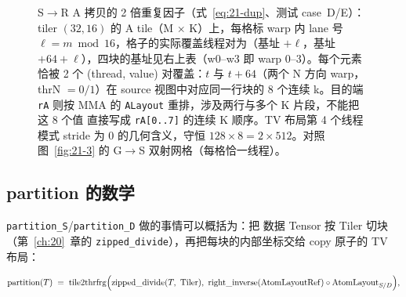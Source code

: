 \begin{figure}[H]
\caption{S$\to$R A 拷贝的 2 倍重复因子（式~\eqref{eq:21-dup}、测试
case~D/E）：tiler $(32,16)$ 的 A tile（M $\times$ K）上，每格标 warp 内
lane 号 $\ell=m\bmod16$，格子的实际覆盖线程对为（基址 $+\ell$，基址
$+64+\ell$），四块的基址见右上表（w0--w3 即 warp 0--3）。每个元素恰被
2 个 (thread, value) 对覆盖：$t$ 与 $t{+}64$（两个 N 方向 warp，thrN
$=0/1$）在 source 视图中对应同一行块的 8 个连续 k。目的端 \texttt{rA}
则按 MMA 的 \texttt{ALayout} 重排，涉及两行与多个 K 片段，不能把这 8 个值
直接写成 \texttt{rA[0..7]} 的连续 K 顺序。TV 布局第 4 个线程模式 stride
为 0 的几何含义，守恒 $128\times8=2\times512$。对照
图~\ref{fig:21-3} 的 G$\to$S 双射网格（每格恰一线程）。}
\label{fig:21-s2r-dup}
\end{figure}

\subsection{partition 的数学}

\texttt{partition\_S}/\texttt{partition\_D} 做的事情可以概括为：把
数据 Tensor 按 Tiler 切块（第~\ref{ch:20}~章的
\texttt{zipped\_\allowbreak{}divide}），再把每块的内部坐标交给 copy 原子的 TV 布局：

\begin{equation}
  \mathrm{partition}(T) \;=\;
  \mathrm{tile2thrfrg}\Bigl(
    \mathrm{zipped\_divide}(T,\ \mathrm{Tiler}),
    \ \mathrm{right\_inverse}(\mathrm{AtomLayoutRef}) \circ \mathrm{AtomLayout}_{S/D}
  \Bigr),
  \label{eq:21-partition}
\end{equation}

